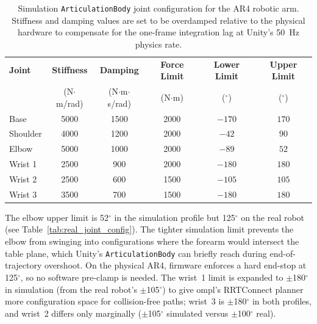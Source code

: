 \begin{table}[t]
	\centering
	\begin{tabular}{lccccc}
		\hline
		\textbf{Joint}       & \textbf{Stiffness}   & \textbf{Damping}        &
		\textbf{Force Limit} & \textbf{Lower Limit} & \textbf{Upper Limit}                                            \\
		                     & (N$\cdot$m/rad)      & (N$\cdot$m$\cdot$s/rad) & (N$\cdot$m) & ($^\circ$) & ($^\circ$) \\
		\hline
		Base                 & 5000                 & 1500                    & 2000        & $-170$     & $170$      \\
		Shoulder             & 4000                 & 1200                    & 2000        & $-42$      & $90$       \\
		Elbow                & 5000                 & 1000                    & 2000        & $-89$      & $52$       \\
		Wrist 1              & 2500                 & 900                     & 2000        & $-180$     & $180$      \\
		Wrist 2              & 2500                 & 600                     & 1500        & $-105$     & $105$      \\
		Wrist 3              & 3500                 & 700                     & 1500        & $-180$     & $180$      \\
		\hline
	\end{tabular}
	\caption{Simulation \texttt{ArticulationBody} joint configuration for the AR4 robotic arm. Stiffness and damping values are set to be overdamped relative to the physical hardware to compensate for the one-frame integration lag at Unity's 50~Hz physics rate.}
	\label{tab:used_joint_config}
\end{table}

The elbow upper limit is 52$^\circ$ in the simulation profile but 125$^\circ$ on the real robot (see Table~\ref{tab:real_joint_config}). The tighter simulation limit prevents the elbow from swinging into configurations where the forearm would intersect the table plane, which Unity's \texttt{ArticulationBody} can briefly reach during end-of-trajectory overshoot. On the physical AR4, firmware enforces a hard end-stop at 125$^\circ$, so no software pre-clamp is needed. The wrist~1 limit is expanded to $\pm$180$^\circ$ in simulation (from the real robot's $\pm$105$^\circ$) to give \gls{ompl}'s RRTConnect planner more configuration space for collision-free paths; wrist~3 is $\pm$180$^\circ$ in both profiles, and wrist~2 differs only marginally ($\pm$105$^\circ$ simulated versus $\pm$100$^\circ$ real).

